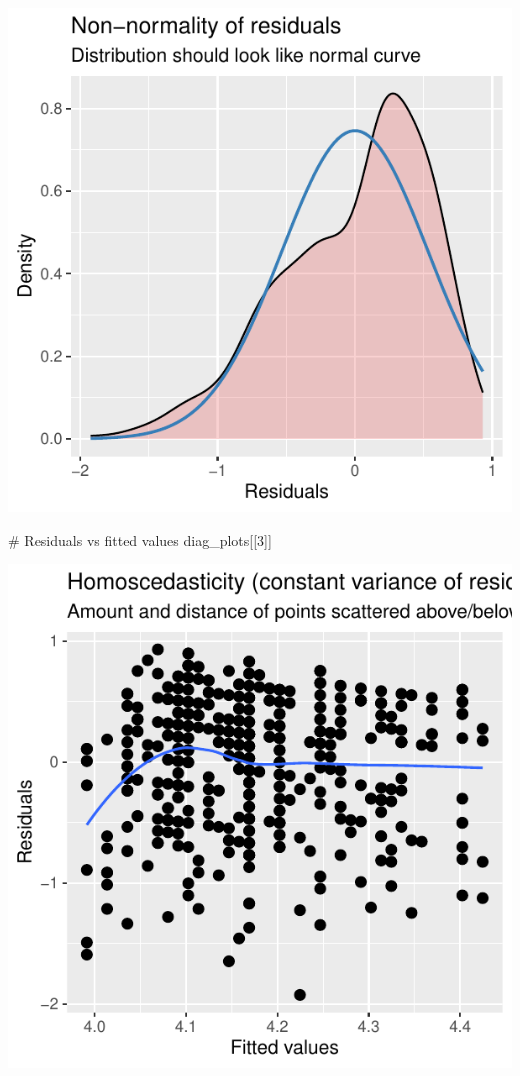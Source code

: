 \documentclass[
  letterpaper,
  DIV=11,
  numbers=noendperiod]{scrartcl}
\newenvironment{Shaded}{\begin{snugshade}}{\end{snugshade}}
\newcommand{\CommentTok}[1]{\textcolor[rgb]{0.37,0.37,0.37}{#1}}
\newcommand{\DecValTok}[1]{\textcolor[rgb]{0.68,0.00,0.00}{#1}}
\newcommand{\NormalTok}[1]{\textcolor[rgb]{0.00,0.23,0.31}{#1}}
\begin{document}
\begin{center}
\includegraphics{index_files/figure-pdf/unnamed-chunk-9-2.pdf}
\end{center}

\begin{Shaded}
\begin{Highlighting}[]
\CommentTok{\# Residuals vs fitted values}
\NormalTok{diag\_plots[[}\DecValTok{3}\NormalTok{]]}
\end{Highlighting}
\end{Shaded}

\begin{center}
\includegraphics{index_files/figure-pdf/unnamed-chunk-9-3.pdf}
\end{center}
\end{document}
